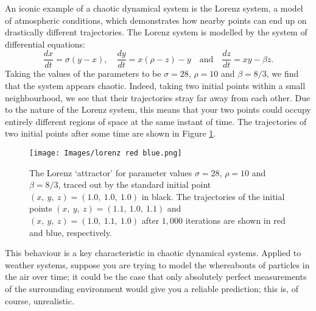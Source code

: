 \begin{exmp}
    An iconic example of a chaotic dynamical system is the Lorenz system, a model of atmospheric conditions\cite{lorenz1963deterministic}, which demonstrates how nearby points can end up on drastically different trajectories. The Lorenz system is modelled by the system of differential equations:
    $$\frac{dx}{dt} = \sigma (y-x), \quad \frac{dy}{dt} = x(\rho -z)-y \quad\text{and} \quad \frac{dz}{dt} = xy-\beta z.$$
Taking the values of the parameters to be $\sigma=28$, $\rho=10$ and $\beta=8/3$, we find that the system appears chaotic. Indeed, taking two initial points within a small neighbourhood, we see that their trajectories stray far away from each other. Due to the nature of the Lorenz system, this means that your two points could occupy entirely different regions of space at the same instant of time. The trajectories of two initial points after some time are shown in Figure \ref{fig:lorenzrb}.
\begin{figure}
    \centering
    \texttt{[image: Images/lorenz red blue.png]}
    \caption{The Lorenz `attractor' for parameter values $\sigma=28$, $\rho=10$ and $\beta=8/3$, traced out by the standard initial point $(x,\ y,\ z)=(1.0,\ 1.0,\ 1.0)$ in black. The trajectories of the initial points $(x,\ y,\ z)=(1.1,\ 1.0,\ 1.1)$ and $(x,\ y,\ z)=(1.0,\ 1.1,\ 1.0)$ after $1,000$ iterations are shown in red and blue, respectively.}
    \label{fig:lorenzrb}
\end{figure}
This behaviour is a key characteristic in chaotic dynamical systems. Applied to weather systems, suppose you are trying to model the whereabouts of particles in the air over time; it could be the case that only absolutely perfect measurements of the surrounding environment would give you a reliable prediction; this is, of course, unrealistic.
\end{exmp}
